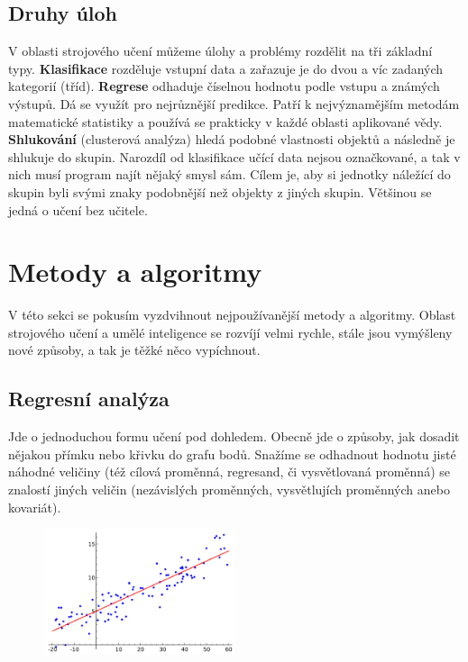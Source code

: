 \documentclass[a4paper,11pt, oneside]{book} \usepackage[czech]{babel}
\begin{document}
	\subsection{Druhy úloh}

	V oblasti strojového učení můžeme úlohy a problémy rozdělit na tři základní typy.
	\textbf{Klasifikace} rozděluje vstupní data a zařazuje je do dvou a víc zadaných
		kategorií (tříd).  \textbf{Regrese} odhaduje číselnou hodnotu podle vstupu a známých výstupů. Dá se využít
	pro nejrůznější predikce. Patří k nejvýznamějším metodám matematické statistiky a
	používá se prakticky v každé oblasti aplikované vědy.
	\textbf{Shlukování} (clusterová analýza) hledá podobné vlastnosti objektů a následně je shlukuje do skupin.
	Narozdíl od klasifikace učící data nejsou označkované, a tak v nich musí program najít nějaký smysl
	sám.
	Cílem je, aby si jednotky náležící do skupin byli svými znaky podobnější než objekty z jiných
	skupin.
	Většinou se jedná o učení bez učitele.


	\section{Metody a algoritmy}

	V této sekci se pokusím vyzdvihnout nejpoužívanější metody a algoritmy.
	Oblast strojového učení a umělé inteligence se rozvíjí velmi rychle, stále
	jsou vymýšleny nové způsoby, a tak je těžké něco vypíchnout.


	\subsection{Regresní analýza}

	Jde o jednoduchou formu učení pod dohledem. Obecně jde o způsoby, jak dosadit
	nějakou přímku nebo křivku do grafu bodů. Snažíme se odhadnout hodnotu jisté
	náhodné veličiny (též cílová proměnná, regresand, či vysvětlovaná proměnná) se
	znalostí jiných veličin (nezávislých proměnných, vysvětlujích proměnných anebo
	kovariát).

	\begin{figure} %
		\centering
		\includegraphics[width=0.5\textwidth]{img/linear-regression.png}
		\label{fig:linear-regression}
	\end{figure}
\end{document}

